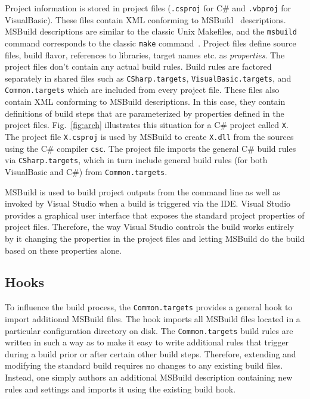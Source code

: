 \documentclass[10pt, conference, compsocconf]{IEEEtran}
\newcommand{\codefamily}{\sffamily}
\newcommand{\csharp}{C\#}
\newcommand{\code}[1]{\lstinline[basicstyle=\codefamily\small]{#1}}
\begin{document}
Project information is stored in project files (\code{.csproj} for
\csharp{} and \code{.vbproj} for VisualBasic). These files 
contain XML conforming to MSBuild~\cite{MSBuild} descriptions. MSBuild
descriptions are similar to the classic Unix Makefiles, and the
\code{msbuild} command corresponds to the classic \code{make} command~\cite{make}.
Project files define source files, build flavor, references to
libraries, target names etc. as \emph{properties}. The project files
don't contain any actual build rules. Build rules are factored
separately in shared files such as \code{CSharp.targets}, \code{VisualBasic.targets}, and \code{Common.targets} which
are included from every project file. These files also contain XML
conforming to MSBuild descriptions. In this case, they contain
definitions of build steps that are parameterized by properties
defined in the project files.
Fig.~\ref{fig:arch} illustrates this situation for a \csharp{} project
called \code{X}. The project file \code{X.csproj} is used by MSBuild to create
\code{X.dll} from the sources using the \csharp{} compiler
\code{csc}. The project file imports the general \csharp{} build rules
via \code{CSharp.targets}, which in turn include general build rules
(for both VisualBasic and \csharp{}) from \code{Common.targets}.

MSBuild is used to build project outputs from the command line as well
as invoked by Visual Studio when a build is triggered via the
IDE. Visual Studio provides a graphical user interface that exposes
the standard project properties of project files. Therefore,
the way Visual Studio controls the build works entirely by it changing
the properties in the project files and letting MSBuild do the build
based on these properties alone.

\subsection*{Hooks}

To influence the build process, the \code{Common.targets} provides a
general hook to import additional MSBuild files. The hook imports all
MSBuild files located in a particular configuration directory on disk.
The \code{Common.targets} build rules are written in such a way as to make
it easy to write additional rules that trigger during a build prior or
after certain other build steps. Therefore, extending and modifying the
standard build requires no changes to any existing build
files. Instead, one simply authors an additional MSBuild description containing new rules
and settings and imports it using the existing build hook. 
\end{document}
